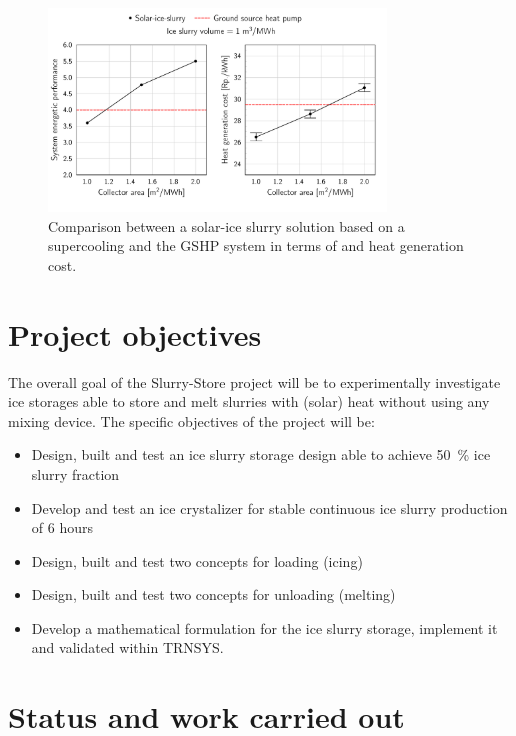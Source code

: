 \documentclass[english]{SFOEYearlyReportEnglish_2018}
\begin{document}
\begin{figure}[!htbp]
    \centering
    \includegraphics[trim={0 0 0 0},clip,width=0.8\textwidth]{figures/cost-Slurry-direct-large-errorBar.pdf}
    \caption{Comparison between a solar-ice slurry solution based on a supercooling and the GSHP system in terms of \si{\spf} and heat generation cost.}
   \label{fig:solar-ice}
\end{figure}


\section{Project objectives}

The overall goal of the Slurry-Store project will be to experimentally investigate ice storages able to store and melt slurries with (solar) heat without using any mixing device.
The specific objectives of the project will be:
\begin{itemize}
    \item Design, built and test an ice slurry storage design able to achieve 50~\% ice slurry fraction
    \item Develop and test an ice crystalizer for stable continuous ice slurry production of 6 hours
    \item Design, built and test two concepts for loading (icing)
    \item Design, built and test two concepts for unloading (melting)
    \item Develop a mathematical formulation for the ice slurry storage, implement it and validated within TRNSYS.
\end{itemize}

\section{Status and work carried out}
\end{document}
